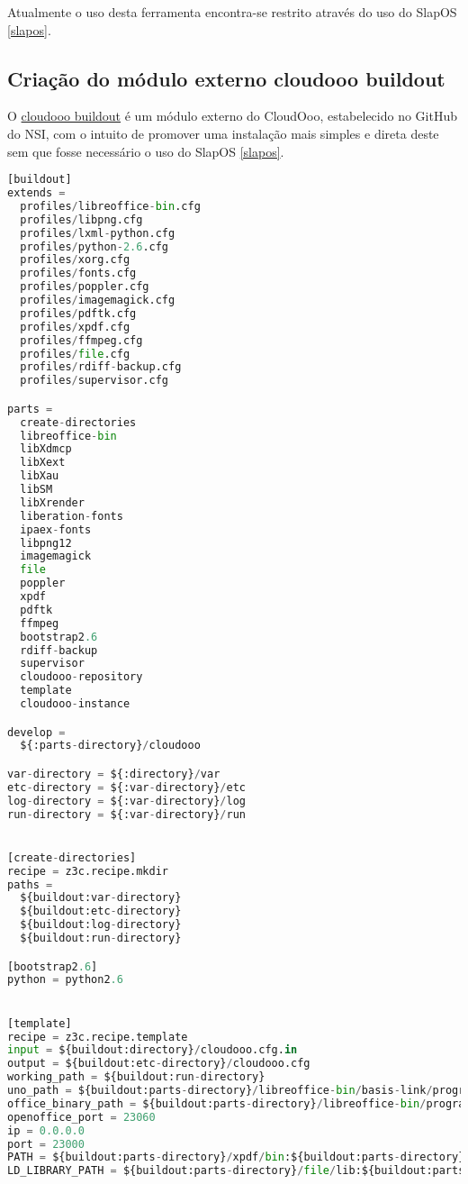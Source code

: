 Atualmente o uso desta ferramenta encontra-se restrito através do uso do SlapOS \ref{slapos}.

\subsection{Criação do módulo externo cloudooo buildout}

O \underline{cloudooo buildout} é um módulo externo do CloudOoo, estabelecido no GitHub do NSI, com o intuito de promover uma instalação mais simples e direta deste sem que fosse necessário o uso do SlapOS \ref{slapos}.

{\singlespace
\begin{lstlisting}[caption=Arquivo de configuração do cloudooo buildout,language=python,label={build}]
[buildout]
extends =
  profiles/libreoffice-bin.cfg 
  profiles/libpng.cfg
  profiles/lxml-python.cfg
  profiles/python-2.6.cfg
  profiles/xorg.cfg
  profiles/fonts.cfg
  profiles/poppler.cfg
  profiles/imagemagick.cfg
  profiles/pdftk.cfg
  profiles/xpdf.cfg
  profiles/ffmpeg.cfg
  profiles/file.cfg
  profiles/rdiff-backup.cfg
  profiles/supervisor.cfg

parts =
  create-directories
  libreoffice-bin
  libXdmcp
  libXext
  libXau
  libSM
  libXrender
  liberation-fonts
  ipaex-fonts
  libpng12
  imagemagick
  file
  poppler
  xpdf
  pdftk
  ffmpeg
  bootstrap2.6
  rdiff-backup
  supervisor
  cloudooo-repository
  template
  cloudooo-instance

develop =
  ${:parts-directory}/cloudooo

var-directory = ${:directory}/var
etc-directory = ${:var-directory}/etc
log-directory = ${:var-directory}/log
run-directory = ${:var-directory}/run


[create-directories]
recipe = z3c.recipe.mkdir
paths = 
  ${buildout:var-directory}
  ${buildout:etc-directory}
  ${buildout:log-directory}
  ${buildout:run-directory}

[bootstrap2.6]
python = python2.6


[template]
recipe = z3c.recipe.template
input = ${buildout:directory}/cloudooo.cfg.in
output = ${buildout:etc-directory}/cloudooo.cfg
working_path = ${buildout:run-directory}
uno_path = ${buildout:parts-directory}/libreoffice-bin/basis-link/program/
office_binary_path = ${buildout:parts-directory}/libreoffice-bin/program/
openoffice_port = 23060
ip = 0.0.0.0
port = 23000
PATH = ${buildout:parts-directory}/xpdf/bin:${buildout:parts-directory}/imagemagick/bin:${buildout:parts-directory}/ffmpeg/bin:${buildout:parts-directory}/pdftk/bin:${buildout:parts-directory}/poppler/bin:${buildout:parts-directory}/ghostscript/bin
LD_LIBRARY_PATH = ${buildout:parts-directory}/file/lib:${buildout:parts-directory}/zlib/lib:${buildout:parts-directory}/freetype/lib:${buildout:parts-directory}/libXext/lib:${buildout:parts-directory}/libXau/lib:${buildout:parts-directory}/libX11/lib:${buildout:parts-directory}/libXdmcp/lib:${buildout:parts-directory}/libxcb/lib



\end{lstlisting}}
